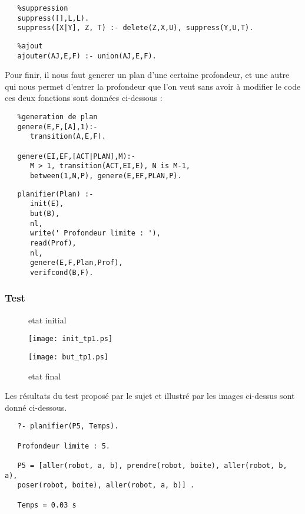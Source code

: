 \documentclass[a4paper,10pt]{article}
\begin{document}
  \begin{lstlisting}
   %suppression
   suppress([],L,L).
   suppress([X|Y], Z, T) :- delete(Z,X,U), suppress(Y,U,T).
  \end{lstlisting}
  
  \begin{lstlisting}
   %ajout
   ajouter(AJ,E,F) :- union(AJ,E,F).
  \end{lstlisting}
  
  Pour finir, il nous faut generer un plan d'une certaine profondeur, et une autre qui nous permet d'entrer la profondeur que l'on veut sans avoir
  \`{a} modifier le code ces deux fonctions sont données ci-dessous :
  
  \begin{lstlisting}
   %generation de plan
   genere(E,F,[A],1):-
      transition(A,E,F).

   genere(EI,EF,[ACT|PLAN],M):-
      M > 1, transition(ACT,EI,E), N is M-1, 
      between(1,N,P), genere(E,EF,PLAN,P).
  \end{lstlisting}
  
  \begin{lstlisting}
   planifier(Plan) :-
      init(E),
      but(B),
      nl,
      write(' Profondeur limite : '),
      read(Prof),
      nl,
      genere(E,F,Plan,Prof),
      verifcond(B,F).
  \end{lstlisting}
  
   \subsubsection{Test}
   
   \begin{figure}[h]
   \begin{minipage}[c]{.46\linewidth}
     \begin{center}
      \caption{etat initial}
      \texttt{[image: init\_tp1.ps]} 
     \end{center}
   \end{minipage} \hfill
   \begin{minipage}[c]{.46\linewidth}
     \begin{center}   
      \caption{etat final}
      \texttt{[image: but\_tp1.ps]}
     \end{center}
   \end{minipage}
   \end{figure}

   Les r\'{e}sultats du test propos\'{e} par le sujet et illustr\'{e} par les images ci-dessus sont donn\'{e} ci-dessous.
   \begin{lstlisting}
   ?- planifier(P5, Temps).

   Profondeur limite : 5.

   P5 = [aller(robot, a, b), prendre(robot, boite), aller(robot, b, a), 
   poser(robot, boite), aller(robot, a, b)] .
   
   Temps = 0.03 s
   \end{lstlisting}
\end{document}
